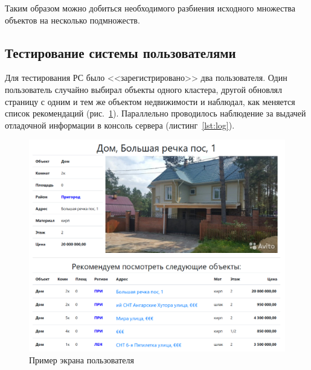 \documentclass[a4paper,14pt,openany,final]{extreport} %
\begin{document}
{Таким образом можно добиться необходимого разбиения исходного множества объектов на несколько подмножеств.

\subsection{Тестирование системы пользователями}
Для тестирования РС было <<зарегистрировано>> два пользователя. Один пользователь случайно выбирал объекты одного кластера, другой обновлял страницу с одним и тем же объектом недвижимости и наблюдал, как меняется список рекомендаций (рис.~\ref{fig:testingbyuser}). Параллельно проводилось наблюдение за выдачей отладочной информации в консоль сервера (листинг~\ref{lst:log}).

\begin{figure}[htbp]
  \centering
  \includegraphics[width=0.8\linewidth]{screen-recommends.png}
  \caption{Пример экрана пользователя}
  \label{fig:testingbyuser}
\end{figure}

}
\end{document}
